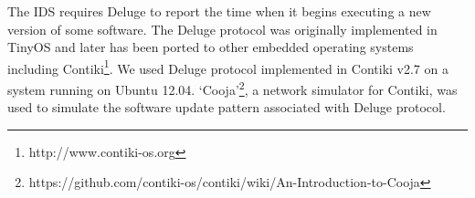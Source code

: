 \documentclass[conference,final]{IEEEtran}
\begin{document}
The IDS requires Deluge to report the time when it begins  executing  a new version of some software.
The Deluge protocol was originally implemented in TinyOS and later has been ported to other embedded operating systems including Contiki\footnote{http://www.contiki-os.org}. 
We used Deluge protocol implemented in Contiki v2.7 on a system running on Ubuntu 12.04.
`Cooja'\footnote{https://github.com/contiki-os/contiki/wiki/An-Introduction-to-Cooja}, a network simulator for Contiki, was used to simulate the software update pattern associated with Deluge protocol.

\end{document}
